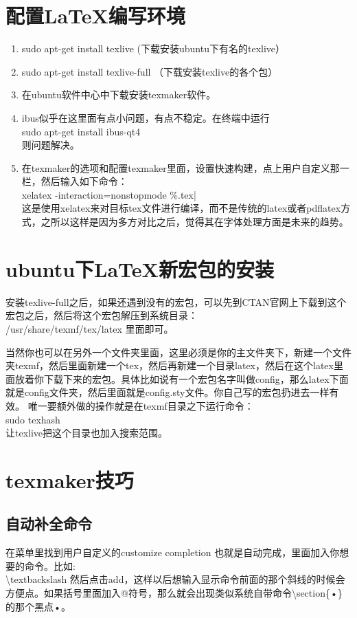\section{配置\LaTeX 编写环境}
\begin{enumerate}
\item sudo apt-get install texlive   (下载安装ubuntu下有名的texlive）
\item sudo apt-get install texlive-full   （下载安装texlive的各个包）
\item 在ubuntu软件中心中下载安装texmaker软件。
\item ibus似乎在这里面有点小问题，有点不稳定。在终端中运行\\sudo apt-get install ibus-qt4\\则问题解决。
\item 在texmaker的选项和配置texmaker里面，设置快速构建，点上用户自定义那一栏，然后输入如下命令：\\
xelatex -interaction=nonstopmode \%.tex| \\
这是使用xelatex来对目标tex文件进行编译，而不是传统的latex或者pdflatex方式，之所以这样是因为多方对比之后，觉得其在字体处理方面是未来的趋势。
\end{enumerate}


\section{ubuntu下\LaTeX 新宏包的安装}
安装texlive-full之后，如果还遇到没有的宏包，可以先到CTAN官网上下载到这个宏包之后，然后将这个宏包解压到系统目录：\\
/usr/share/texmf/tex/latex 里面即可。

当然你也可以在另外一个文件夹里面，这里必须是你的主文件夹下，新建一个文件夹texmf，然后里面新建一个tex，然后再新建一个目录latex，然后在这个latex里面放着你下载下来的宏包。具体比如说有一个宏包名字叫做config，那么latex下面就是config文件夹，然后里面就是config.sty文件。你自己写的宏包扔进去一样有效。
唯一要额外做的操作就是在texmf目录之下运行命令：\\
sudo texhash  \\
让texlive把这个目录也加入搜索范围。


\section{texmaker技巧}
\subsection{自动补全命令}
在菜单里找到用户自定义的customize completion 也就是自动完成，里面加入你想要的命令。比如:\\
\textbackslash textbackslash 然后点击add，这样以后想输入显示命令前面的那个斜线的时候会方便点。如果括号里面加入@符号，那么就会出现类似系统自带命令\textbackslash section\{•\}的那个黑点•。

